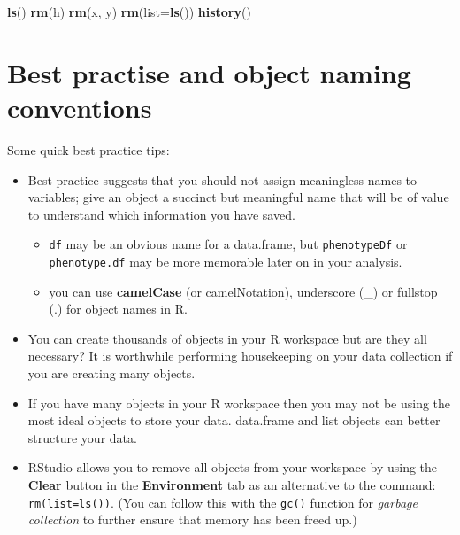 \documentclass[a4paper]{book}
\newenvironment{Shaded}{\begin{snugshade}}{\end{snugshade}}
\newcommand{\KeywordTok}[1]{\textcolor[rgb]{0.13,0.29,0.53}{\textbf{{#1}}}}
\newcommand{\DataTypeTok}[1]{\textcolor[rgb]{0.13,0.29,0.53}{{#1}}}
\newcommand{\NormalTok}[1]{{#1}}
\providecommand{\tightlist}{%
  \setlength{\itemsep}{0pt}\setlength{\parskip}{0pt}}
\renewenvironment{Shaded}
{\vspace{1.5em}\begin{leftbar}\begin{snugshade}}
{\end{snugshade}\end{leftbar}\vspace{3pt}}
\begin{document}
\begin{Shaded}
\begin{Highlighting}[]
\KeywordTok{ls}\NormalTok{()}
\KeywordTok{rm}\NormalTok{(h)}
\KeywordTok{rm}\NormalTok{(x, y)}
\KeywordTok{rm}\NormalTok{(}\DataTypeTok{list=}\KeywordTok{ls}\NormalTok{())}
\KeywordTok{history}\NormalTok{()}
\end{Highlighting}
\end{Shaded}

\section{Best practise and object naming
conventions}\label{best-practise-and-object-naming-conventions}

Some quick best practice tips:

\begin{itemize}
\item
  Best practice suggests that you should not assign meaningless names to
  variables; give an object a succinct but meaningful name that will be
  of value to understand which information you have saved.

  \begin{itemize}
  \tightlist
  \item
    \texttt{df} may be an obvious name for a data.frame, but
    \texttt{phenotypeDf} or \texttt{phenotype.df} may be more memorable
    later on in your analysis.
  \item
    you can use \textbf{camelCase} (or camelNotation), underscore (\_)
    or fullstop (.) for object names in R.
  \end{itemize}
\item
  You can create thousands of objects in your R workspace but are they
  all necessary? It is worthwhile performing housekeeping on your data
  collection if you are creating many objects.
\item
  If you have many objects in your R workspace then you may not be using
  the most ideal objects to store your data. data.frame and list objects
  can better structure your data.
\item
  RStudio allows you to remove all objects from your workspace by using
  the \textbf{Clear} button in the \textbf{Environment} tab as an
  alternative to the command: \texttt{rm(list=ls())}. (You can follow
  this with the \texttt{gc()} function for \emph{garbage collection} to
  further ensure that memory has been freed up.)
\end{itemize}
\end{document}
